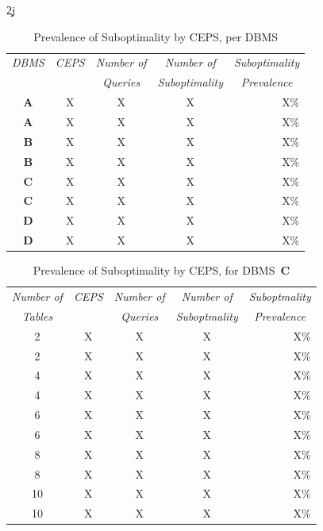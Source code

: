 \c2j{}{\begin{table}[t]
\begin{center}
\begin{tabular}{c|c|c|c|r}
{\em DBMS} & {\em CEPS} & {\em Number of} & {\em Number of} & \multicolumn{1}{|c}{\em Suboptimality}\\
&&{\em Queries} & {\em Suboptimality} &  \multicolumn{1}{|c}{\em Prevalence}\\
\hline
{\bf A} & X & X & X & X\%\\
{\bf A} & X & X & X & X\%\\

{\bf B} & X & X & X & X\%\\
{\bf B} & X & X & X & X\%\\

{\bf C} & X & X & X & X\%\\
{\bf C} & X & X & X & X\%\\

{\bf D} & X & X & X & X\%\\
{\bf D} & X & X & X & X\%\\
\end{tabular}
\end{center}
\caption{Prevalence of Suboptimality by CEPS, per DBMS\label{tab:ceps}}
\end{table}

\begin{table}
\begin{center}
\begin{tabular}{c|c|c|c|r}
{\em Number of} &{\em CEPS} & {\em Number of} & {\em Number of} & \multicolumn{1}{|c}{\em Suboptmality}\\
{\em Tables}&&{\em Queries} & {\em Suboptmality} &  \multicolumn{1}{|c}{\em Prevalence}\\
\hline
2 & X &X & X & X\%\\
2 & X &X & X & X\%\\

4 & X &X & X & X\%\\
4 & X &X & X & X\%\\

6 & X &X & X & X\%\\
6 & X &X & X & X\%\\

8 & X &X & X & X\%\\
8 & X &X & X & X\%\\

10 & X &X & X & X\%\\
10 & X &X & X & X\%\\
\end{tabular}
\end{center}
\caption{Prevalence of Suboptimality by CEPS, for DBMS~{\bf C}\label{tab:cepsC}}
\end{table}
}
